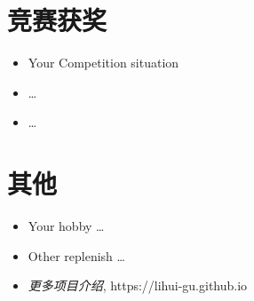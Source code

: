 \documentclass{resume}
\begin{document}
\section{\faTrophy 竞赛获奖}
\begin{itemize}[parsep=0.2ex]
  \item Your Competition situation
  \item \dots
  \item \dots
\end{itemize}

\section{\faHandPeaceO 其他}
\begin{itemize}[parsep=0.2ex]
  \item Your hobby \dots
  \item Other replenish \dots
  \item \textit{更多项目介绍}, https://lihui-gu.github.io
\end{itemize}
\end{document}

